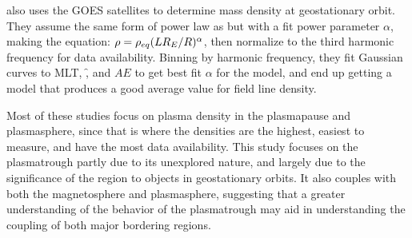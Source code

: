 \cite{Denton2015FieldLineDist} also uses the GOES satellites to determine mass density at geostationary orbit. They assume the same form of power law as \cite{Takahashi2006MassDensityInferred} but with a fit power parameter $\alpha$, making the equation: $\rho=\rho_{eq}(LR_E/R)^{\alpha}$, then normalize to the third harmonic frequency for data availability. Binning by harmonic frequency, they fit Gaussian curves to MLT, \f, and $AE$ to get best fit $\alpha$ for the model, and end up getting a model that produces a good average value for field line density.

Most of these studies focus on plasma density in the plasmapause and plasmasphere, since that is where the densities are the highest, easiest to measure, and have the most data availability. This study focuses on the plasmatrough partly due to its unexplored nature, and largely due to the significance of the region to objects in geostationary orbits. It also couples with both the magnetosphere and plasmasphere, suggesting that a greater understanding of the behavior of the plasmatrough may aid in understanding the coupling of both major bordering regions.




